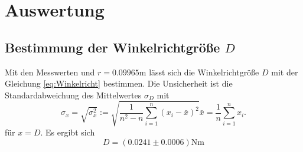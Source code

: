 \section{Auswertung} 
\label{sec:swrtng}
\subsection{Bestimmung der Winkelrichtgröße $D$}

\noindent Mit den Messwerten und $r=0.09965\si{\meter}$ lässt sich die Winkelrichtgröße $D$ mit der Gleichung \eqref{eq:Winkelricht} bestimmen. Die Unsicherheit ist die Standardabweichung des Mittelwertes $\sigma_D$ mit
\begin{subequations}
	\begin{equation}
		\sigma_x = \sqrt{\sigma_x^2} := \sqrt{\frac{1}{n^2-n} \sum_{i=1}^n{(x_i-\bar{x})^2}}
	\end{equation}
	\begin{equation}
		\bar{x} = \frac{1}{n} \sum_{i=1}^n{x_i}.
	\end{equation}
\end{subequations}
für $x=D$.
Es ergibt sich 
\begin{equation}
	\label{wert:Winkelricht}
	D=(0.0241\pm0.0006)\si{\newton\meter}
\end{equation}
